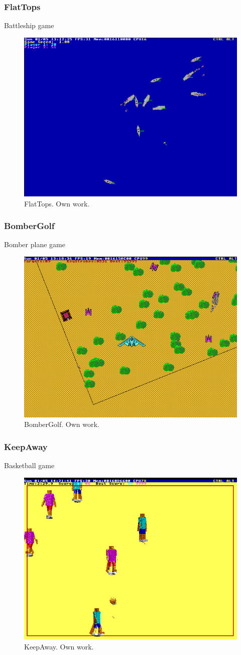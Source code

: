 \documentclass{beamer}
\begin{document}
	\begin{frame}
		\frametitle{FlatTops}
		Battleship game
		\begin{figure}
			\centering
			\includegraphics[width=0.6\linewidth]{images/flat_tops.png}
			\caption{FlatTops. Own work.}
			\label{fig:flat_tops}
		\end{figure}
	\end{frame}

	\begin{frame}
		\frametitle{BomberGolf}
		Bomber plane game
		\begin{figure}
			\centering
			\includegraphics[width=0.6\linewidth]{images/bomber_golf.png}
			\caption{BomberGolf. Own work.}
			\label{fig:bomber_golf}
		\end{figure}
	\end{frame}

	\begin{frame}
		\frametitle{KeepAway}
		Basketball game
		\begin{figure}
			\centering
			\includegraphics[width=0.6\linewidth]{images/keep_away.png}
			\caption{KeepAway. Own work.}
			\label{fig:keep_away}
		\end{figure}
	\end{frame}
\end{document}
